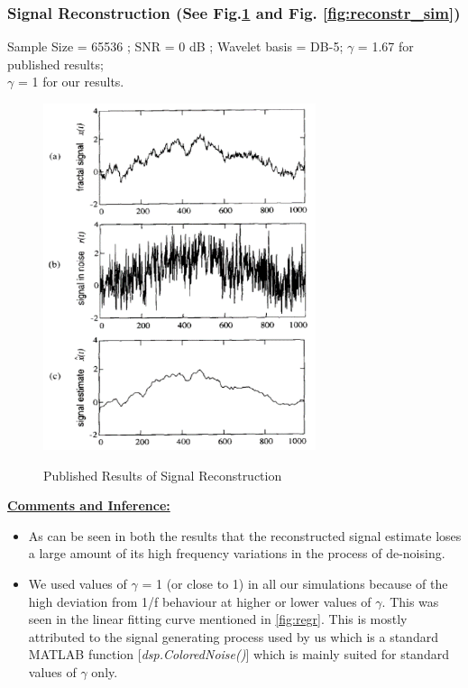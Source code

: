 \documentclass[a4paper]{article}
\begin{document}
\subsubsection{Signal Reconstruction (See Fig.\ref{fig:reconst} and Fig. \ref{fig:reconstr_sim})}
Sample Size = 65536 ; SNR = 0 dB ; Wavelet basis = DB-5; $\gamma$ = 1.67 for published results; \\$\gamma$ = 1 for our results.

\begin{figure}
\vspace{-10pt}
\includegraphics[width=8cm]{reconst.png}
\label{fig:reconst}
\caption{Published Results of Signal Reconstruction}
\vspace{-130pt}
\end{figure}
\underline{\textbf{Comments and Inference:}}
\begin{itemize}
\item As can be seen in both the results that the reconstructed signal estimate loses a large amount of its high frequency variations in the process of de-noising.
\item We used values of $\gamma$ = 1 (or close to 1) in all our simulations because of the high deviation from 1/f behaviour at higher or lower values of $\gamma$. This was seen in the linear fitting curve mentioned in \ref{fig:regr}. This is mostly attributed to the signal generating process used by us which is a standard MATLAB function [\textit{dsp.ColoredNoise()}] which is mainly suited for standard values of $\gamma$ only.
\end{itemize}
\end{document}
